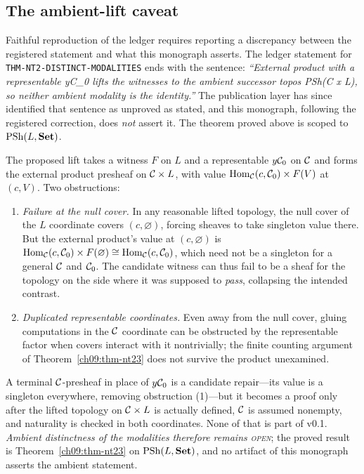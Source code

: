 \subsection{The ambient-lift caveat}\label{ch09:sec-ambient-caveat}

Faithful reproduction of the ledger requires reporting a discrepancy between the registered statement and what this monograph asserts. The ledger statement for \texttt{THM-NT2-DISTINCT-MODALITIES} ends with the sentence: \emph{``External product with a representable yC\_0 lifts the witnesses to the ambient successor topos PSh(C x L), so neither ambient modality is the identity.''} The publication layer has since identified that sentence as unproved as stated, and this monograph, following the registered correction, does \emph{not} assert it. The theorem proved above is scoped to $\mathrm{PSh}(L,\mathbf{Set})$.

\begin{boundary}\label{ch09:boundary-ambient}
The proposed lift takes a witness $F$ on $L$ and a representable $y\mathcal{C}_{0}$ on $\mathcal{C}$ and forms the external product presheaf on $\mathcal{C}\times L$, with value $\mathrm{Hom}_{\mathcal{C}}(c,\mathcal{C}_{0})\times F(V)$ at $(c,V)$. Two obstructions:
\begin{enumerate}
\item \emph{Failure at the null cover.} In any reasonable lifted topology, the null cover of the $L$ coordinate covers $(c,\varnothing)$, forcing sheaves to take singleton value there. But the external product's value at $(c,\varnothing)$ is $\mathrm{Hom}_{\mathcal{C}}(c,\mathcal{C}_{0})\times F(\varnothing)\cong\mathrm{Hom}_{\mathcal{C}}(c,\mathcal{C}_{0})$, which need not be a singleton for a general $\mathcal{C}$ and $\mathcal{C}_{0}$. The candidate witness can thus fail to be a sheaf for the topology on the side where it was supposed to \emph{pass}, collapsing the intended contrast.
\item \emph{Duplicated representable coordinates.} Even away from the null cover, gluing computations in the $\mathcal{C}$ coordinate can be obstructed by the representable factor when covers interact with it nontrivially; the finite counting argument of Theorem~\ref{ch09:thm-nt23} does not survive the product unexamined.
\end{enumerate}
A terminal $\mathcal{C}$-presheaf in place of $y\mathcal{C}_{0}$ is a candidate repair---its value is a singleton everywhere, removing obstruction (1)---but it becomes a proof only after the lifted topology on $\mathcal{C}\times L$ is actually defined, $\mathcal{C}$ is assumed nonempty, and naturality is checked in both coordinates. None of that is part of v0.1. \emph{Ambient distinctness of the modalities therefore remains \textsc{open}}; the proved result is Theorem~\ref{ch09:thm-nt23} on $\mathrm{PSh}(L,\mathbf{Set})$, and no artifact of this monograph asserts the ambient statement.
\end{boundary}

